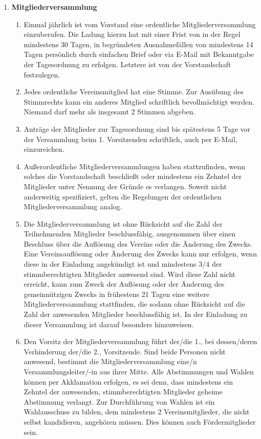 \documentclass{article}
\begin{document}
\begin{enumerate}[§ 1.]
\item \textsf{\textbf{Mitgliederversammlung}}
	\begin{enumerate}[1.]
	\item Einmal jährlich ist vom Vorstand eine ordentliche Mitgliederversammlung
einzuberufen.
	Die Ladung hierzu hat mit einer Frist von in der Regel mindestens 30 Tagen, in begründeten Ausnahmefällen von mindestens 14 Tagen persönlich durch einfachen Brief oder via E-Mail mit Bekanntgabe der Tagesordnung zu erfolgen. Letztere ist von der Vorstandschaft festzulegen.
	\item Jedes ordentliche Vereinsmitglied hat eine Stimme. Zur Ausübung des
	Stimmrechts kann ein anderes Mitglied schriftlich bevollmächtigt werden.
	Niemand darf mehr als insgesamt 2 Stimmen abgeben.
	\item Anträge der Mitglieder zur Tagesordnung sind bis spätestens 5 Tage vor der Versammlung beim 1. Vorsitzenden schriftlich, auch per E-Mail, einzureichen.
	\item Außerordentliche Mitgliederversammlungen haben stattzufinden, wenn solches die Vorstandschaft beschließt oder mindestens ein Zehntel der Mitglieder unter Nennung der Gründe es verlangen. Soweit nicht anderweitig spezifiziert, gelten die Regelungen der ordentlichen Mitgliederversammlung analog.
	\item Die Mitgliederversammlung ist ohne Rücksicht auf die Zahl der Teilnehmenden Mitglieder beschlussfähig, ausgenommen über einen Beschluss über die Auflösung des Vereins oder die Änderung des Zwecks.
	Eine Vereinsauflösung oder Änderung des Zwecks kann nur erfolgen, wenn diese in der Einladung angekündigt ist und mindestens 3/4 der stimmberechtigten Mitglieder anwesend sind.
	Wird diese Zahl nicht erreicht, kann zum Zweck der Auflösung oder der Änderung des gemeinnützigen Zwecks in frühestens 21 Tagen eine weitere Mitgliederversammlung stattfinden, die sodann ohne Rücksicht auf die Zahl der anwesenden Mitglieder beschlussfähig ist.
	In der Einladung zu dieser Versammlung ist darauf besonders hinzuweisen.
	\item Den Vorsitz der Mitgliederversammlung führt der/die 1., bei dessen/deren Verhinderung der/die 2., Vorsitzende. Sind beide Personen nicht anwesend, bestimmt die Mitgliederversammlung eine/n Versammlungsleiter/-in aus ihrer Mitte.
	Alle Abstimmungen und Wahlen können per Akklamation erfolgen, es sei denn, dass mindestens ein Zehntel der anwesenden, stimmberechtigten Mitglieder geheime Abstimmung verlangt.
	Zur Durchführung von Wahlen ist ein Wahlausschuss zu bilden, dem mindestens 2 Vereinsmitglieder, die nicht selbst kandidieren, angehören müssen. Dies können auch Fördermitglieder sein.

\end{enumerate}
\end{enumerate}
\end{document}
